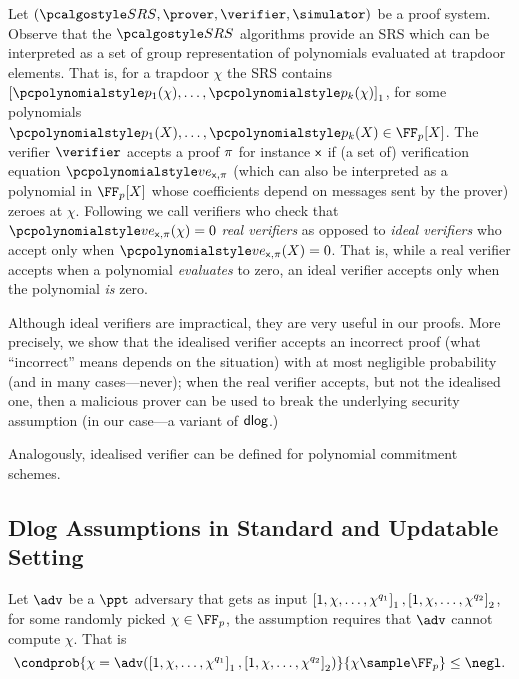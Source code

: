  Let
$(\SRScer, \prover, \verifier, \simulator)$ be a proof system.
Observe that the $\SRScer$ algorithms provide an SRS which can be interpreted as a set
of group representation of polynomials evaluated at trapdoor elements. That is, for a
trapdoor $\chi$ the SRS contains $\gone{\p{p_1}(\chi), \ldots, \p{p_k}(\chi)}$, for
some polynomials $\p{p_1}(X), \ldots, \p{p_k}(X) \in \FF_p[X]$. The verifier
$\verifier$ accepts a proof $\pi$ for instance $\mathsf{x}$ if (a set of) verification
equation $\vereq_{\inp, \zkproof}$ (which can also be interpreted as a polynomial in
$\FF_p[X]$ whose coefficients depend on messages sent by the prover) zeroes at
$\chi$. Following \cite{EPRINT:GabWilCio19} we call verifiers who check that
$\vereq_{\inp, \zkproof}(\chi) = 0$ \emph{real verifiers} as opposed to \emph{ideal
  verifiers} who accept only when $\vereq_{\inp, \zkproof}(X) = 0$. That is, while a
real verifier accepts when a polynomial \emph{evaluates} to zero, an ideal verifier
accepts only when the polynomial \emph{is} zero.

Although ideal verifiers are impractical, they are very useful in our
proofs. More precisely, we show that
the idealised verifier accepts an incorrect proof (what ``incorrect''
  means depends on the situation) with at most negligible probability (and in many
  cases---never);
when the real verifier accepts, but not the idealised one, then a malicious
  prover can be used to break the underlying security assumption (in our case---a
  variant of $\mathsf{dlog}$.)

Analogously, idealised verifier can be defined for polynomial commitment schemes.

\subsection{Dlog Assumptions in Standard and Updatable Setting}
\label{dlog-upd}
\label{sec:udlog_assumptions}


\label{sec:dlog_assumptions}
\begin{definition}\label{def:dlog}
	Let $\adv$ be a $\ppt$ adversary that gets as input
  $\left[1, \chi, \ldots, \chi^{q_1}\right]_{1}, \left[1, \chi, \ldots, \chi^{q_2}\right]_{2}$, for
  some randomly picked $\chi \in \FF_p$, the assumption requires that $\adv$ cannot compute $\chi$. That is
	\[
		\condprob{\chi = \adv(\gone{1, \chi, \ldots, \chi^{q_1}}, \gtwo{1, \chi,
        \ldots, \chi^{q_2} })}{\chi \sample \FF_p} \leq \negl.
	\]
\end{definition}

